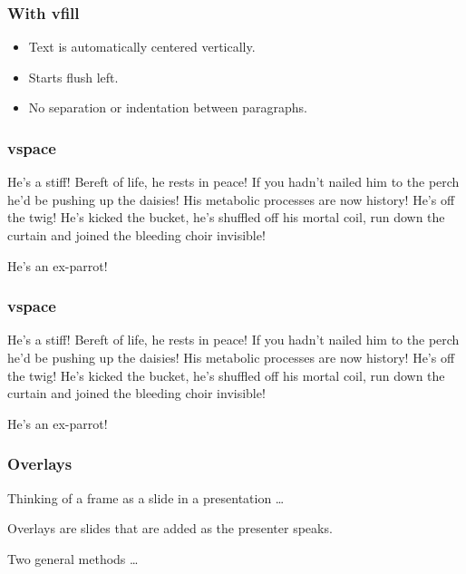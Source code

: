 \documentclass{beamer}
\begin{document}
\begin{frame}\frametitle{With vfill}

\vfill

\begin{itemize}
\vfill

\item Text is automatically centered vertically.

\vfill

\item Starts flush left.

\vfill

\item No separation or indentation between paragraphs. %


\end{itemize}
\vfill %

\end{frame}

\begin{frame}\frametitle{vspace}
He's a stiff! Bereft of life, he rests in peace! If you hadn't nailed him to the perch he'd be pushing up the daisies!
His metabolic processes are now history! He's off the twig!  He's kicked the bucket, he's shuffled off his mortal coil, run down the curtain and joined the bleeding choir invisible!

He's an ex-parrot!
\end{frame}

\begin{frame}\frametitle{vspace}

He's a stiff! Bereft of life, he rests in peace! If you hadn't nailed him to the perch he'd be pushing up the daisies!
His metabolic processes are now history! He's off the twig!  He's kicked the bucket, he's shuffled off his mortal coil, run down the curtain and joined the bleeding choir invisible!

\vspace{0.1in}

He's an ex-parrot!
\end{frame}



\begin{frame}\frametitle{Overlays}

\vfill
Thinking of a frame as a slide in a presentation \ldots 

\vfill
\pause


Overlays are \pause slides \pause that \pause are added \pause as the presenter \pause speaks.  %

\vfill

\pause Two general methods \ldots

\end{frame}
\end{document}
